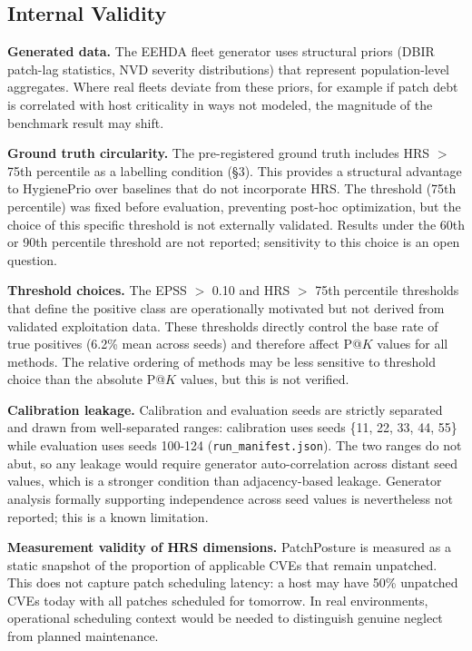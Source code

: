 \subsection{Internal Validity}

\textbf{Generated data.} The EEHDA fleet generator uses structural priors (DBIR patch-lag statistics, NVD severity distributions) that represent population-level aggregates. Where real fleets deviate from these priors, for example if patch debt is correlated with host criticality in ways not modeled, the magnitude of the benchmark result may shift.

\textbf{Ground truth circularity.} The pre-registered ground truth includes HRS $>$ 75th percentile as a labelling condition (\S3). This provides a structural advantage to HygienePrio over baselines that do not incorporate HRS. The threshold (75th percentile) was fixed before evaluation, preventing post-hoc optimization, but the choice of this specific threshold is not externally validated. Results under the 60th or 90th percentile threshold are not reported; sensitivity to this choice is an open question.

\textbf{Threshold choices.} The EPSS $>$ 0.10 and HRS $>$ 75th percentile thresholds that define the positive class are operationally motivated but not derived from validated exploitation data. These thresholds directly control the base rate of true positives (6.2\% mean across seeds) and therefore affect P@$K$ values for all methods. The relative ordering of methods may be less sensitive to threshold choice than the absolute P@$K$ values, but this is not verified.

\textbf{Calibration leakage.} Calibration and evaluation seeds are strictly separated and drawn from well-separated ranges: calibration uses seeds \{11, 22, 33, 44, 55\} while evaluation uses seeds 100-124 (\texttt{run\_manifest.json}). The two ranges do not abut, so any leakage would require generator auto-correlation across distant seed values, which is a stronger condition than adjacency-based leakage. Generator analysis formally supporting independence across seed values is nevertheless not reported; this is a known limitation.

\textbf{Measurement validity of HRS dimensions.} PatchPosture is measured as a static snapshot of the proportion of applicable CVEs that remain unpatched. This does not capture patch scheduling latency: a host may have 50\% unpatched CVEs today with all patches scheduled for tomorrow. In real environments, operational scheduling context would be needed to distinguish genuine neglect from planned maintenance.

